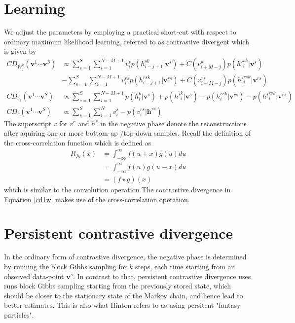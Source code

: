 \documentclass[12pt]{article}
\begin{document}
\section{Learning}
We adjust the parameters by employing a practical
short-cut with respect to ordinary maximum likelihood learning,
referred to as contrastive divergent which is given by
\begin{align}
	CD_{W_j^k}(\mathbf{v}^1\cdots\mathbf{v}^S) &\propto 
	\sum_{s=1}^S \sum_{i=1}^{N-M+1} v_{i}^s p(h_{i-j+1}^{sk}|\mathbf{v}^s)+
	 C(v_{i+M-j}^s) p({h'}_{i}^{sk}|\mathbf{v}^s)\nonumber\\
	 &- \sum_{s=1}^S \sum_{i=1}^{N-M+1}v_{i}^{rs} p(h_{i-j+1}^{rsk}|\mathbf{v}^{rs})
	 +C(v_{i+M-j}^{rs}) p({h'}_{i}^{rsk}|\mathbf{v}^{rs})\label{cd1w}\\
	CD_{b_k}(\mathbf{v}^1\cdots\mathbf{v}^S) &\propto 
	\sum_{s=1}^S \sum_{i=1}^{N-M+1} p(h_{i}^{k}|\mathbf{v}^s)+
	p({h'}_{i}^{k}|\mathbf{v}^s)
	- p(h_{i}^{rsk}|\mathbf{v}^{rs})
	- p({h'}_{i}^{rsk}|\mathbf{v}^{rs})\label{cd1b}\\
	CD_{c}(\mathbf{v}^1\cdots\mathbf{v}^S) &\propto 
	\sum_{s=1}^S \sum_{i=1}^{N} v_{i}^s 
	- p(v_{i}^{rs}|\mathbf{h}^{rs})
\end{align}
The superscript $r$ for $v^r$ and $h^r$ in the negative phase denote the
reconstructions after aquiring one or more bottom-up /top-down samples.
Recall the definition of the cross-correlation function which is defined as
\begin{align}
 R_{fg}(x)&=\int_{-\infty}^\infty f(u+x)g(u)du\\
 &=\int_{-\infty}^\infty f(u)g(u-x)du\\
 &=(f\star g)(x)
\end{align}
which is similar to the convolution operation
The contrastive divergence in Equation \ref{cd1w} makes 
use of the cross-correlation operation.
\section{Persistent contrastive divergence}
In the ordinary form of contrastive divergence, the negative phase is
determined by running the block Gibbs sampling for $k$ steps, each time
starting from an observed data-point $\mathbf{v}^s$. 
In contrast to that, persistent contrastive divergence uses runs
block Gibbs sampling starting from  the previously stored state, which
should be closer to the stationary state of the Markov chain, 
and hence lead to better estimates.
This is also what Hinton refers to as using persitent "fantasy particles".
\end{document}
